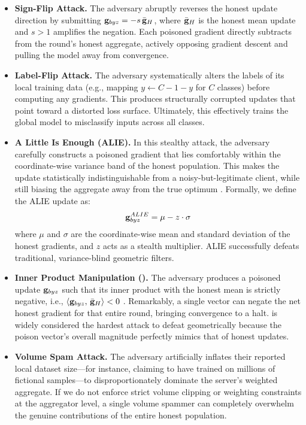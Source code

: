\documentclass[../main.tex]{subfiles}
\begin{document}
\begin{itemize}
    \item \textbf{Sign-Flip Attack.}
    The adversary abruptly reverses the honest update direction by submitting $\mathbf{g}_{byz} = -s\,\bar{\mathbf{g}}_{H}$, where $\bar{\mathbf{g}}_{H}$ is the honest mean update and $s > 1$ amplifies the negation. Each poisoned gradient directly subtracts from the round's honest aggregate, actively opposing gradient descent and pulling the model away from convergence.

    \item \textbf{Label-Flip Attack.}
    The adversary systematically alters the labels of its local training data (e.g., mapping $y \leftarrow C - 1 - y$ for $C$ classes) before computing any gradients. This produces structurally corrupted updates that point toward a distorted loss surface. Ultimately, this effectively trains the global model to misclassify inputs across all classes.

    \item \textbf{A Little Is Enough (ALIE).}
    In this stealthy attack, the adversary carefully constructs a poisoned gradient that lies comfortably within the coordinate-wise variance band of the honest population. This makes the update statistically indistinguishable from a noisy-but-legitimate client, while still biasing the aggregate away from the true optimum \citep{baruch2019little}. Formally, we define the ALIE update as:
    \begin{equation}
        \mathbf{g}_{byz}^{ALIE} = \mu - z \cdot \sigma
    \end{equation}
    where $\mu$ and $\sigma$ are the coordinate-wise mean and standard deviation of the honest gradients, and $z$ acts as a stealth multiplier. ALIE successfully defeats traditional, variance-blind geometric filters.

    \item \textbf{Inner Product Manipulation (\ipm{}).}
    The adversary produces a poisoned update $\mathbf{g}_{byz}$ such that its inner product with the honest mean is strictly negative, i.e., $\left\langle \mathbf{g}_{byz},\, \bar{\mathbf{g}}_{H} \right\rangle < 0$ \citep{xie2020fall}. Remarkably, a single \ipm{} vector can negate the net honest gradient for that entire round, bringing convergence to a halt. \ipm{} is widely considered the hardest attack to defeat geometrically because the poison vector's overall magnitude perfectly mimics that of honest updates.

    \item \textbf{Volume Spam Attack.}
    The adversary artificially inflates their reported local dataset size---for instance, claiming to have trained on millions of fictional samples---to disproportionately dominate the server's weighted aggregate. If we do not enforce strict volume clipping or weighting constraints at the aggregator level, a single volume spammer can completely overwhelm the genuine contributions of the entire honest population.


\end{itemize}
\end{document}
